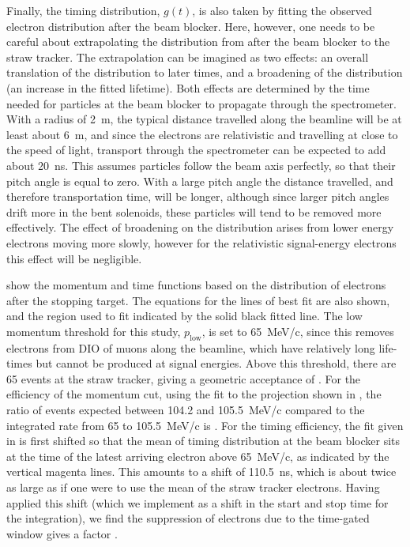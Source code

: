 Finally, the timing distribution, $g(t)$, is also taken by fitting the observed electron distribution after the beam blocker.
Here, however, one needs to be careful about extrapolating the distribution from after the beam blocker to the straw tracker.
The extrapolation can be imagined as two effects: an overall translation of the distribution to later times, and a broadening of the distribution (an increase in the fitted lifetime).
Both effects are determined by the time needed for particles at the beam blocker to propagate through the spectrometer.
With a radius of 2~m, the typical distance travelled along the beamline will be at least about 6~m, and since the electrons are relativistic and travelling at close to the speed of light, transport through the spectrometer can be expected to add about 20~ns.
This assumes particles follow the beam axis perfectly, so that their pitch angle is equal to zero.
With a large pitch angle the distance travelled, and therefore transportation time, will be longer, although since larger pitch angles drift more in the bent solenoids, these particles will tend to be removed more effectively.
The effect of broadening on the distribution arises from lower energy electrons moving more slowly, however for the relativistic signal-energy electrons this effect will be negligible.

 show the momentum and time functions based on the distribution of electrons after the stopping target.
The equations for the lines of best fit are also shown, and the region used to fit indicated by the solid black fitted line.
The low momentum threshold for this study, $p_\textrm{low}$, is set to 65~MeV/c, since this removes electrons from \ac{DIO} of muons along the beamline, which have relatively long life-times but cannot be produced at signal energies.
Above this threshold, there are 65 events at the straw tracker, giving a geometric acceptance of \VarBeamBgGeometric.
For the efficiency of the momentum cut, using the fit to the projection shown in , the ratio of events expected between 104.2 and 105.5~MeV/c compared to the integrated rate from 65 to 105.5~MeV/c is \VarBeamBgMomentum.
For the timing efficiency, the fit given in  is first shifted so that the mean of timing distribution at the beam blocker sits at the time of the latest arriving electron above 65~MeV/c, as indicated
by the vertical magenta lines. 
This amounts to a shift of 110.5~ns, which is about twice as large as if one were to use the mean of the straw tracker electrons.
Having applied this shift (which we implement as a shift in the start and stop time for the integration), we find the suppression of electrons due to the time-gated window gives a factor \VarBeamBgTiming.

